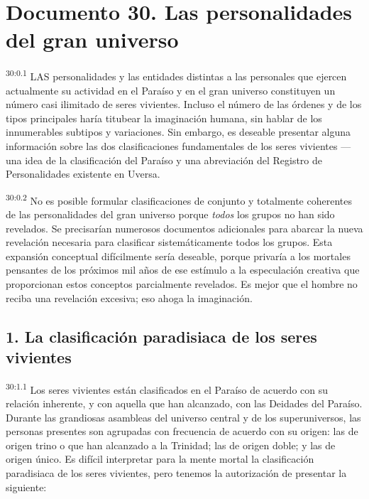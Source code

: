 \chapter{Documento 30. Las personalidades del gran universo}
\par
\textsuperscript{30:0.1} LAS personalidades y las entidades distintas a las personales que ejercen actualmente su actividad en el Paraíso y en el gran universo constituyen un número casi ilimitado de seres vivientes. Incluso el número de las órdenes y de los tipos principales haría titubear la imaginación humana, sin hablar de los innumerables subtipos y variaciones. Sin embargo, es deseable presentar alguna información sobre las dos clasificaciones fundamentales de los seres vivientes ---una idea de la clasificación del Paraíso y una abreviación del Registro de Personalidades existente en Uversa.

\par
\textsuperscript{30:0.2} No es posible formular clasificaciones de conjunto y totalmente coherentes de las personalidades del gran universo porque \textit{todos} los grupos no han sido revelados. Se precisarían numerosos documentos adicionales para abarcar la nueva revelación necesaria para clasificar sistemáticamente todos los grupos. Esta expansión conceptual difícilmente sería deseable, porque privaría a los mortales pensantes de los próximos mil años de ese estímulo a la especulación creativa que proporcionan estos conceptos parcialmente revelados. Es mejor que el hombre no reciba una revelación excesiva; eso ahoga la imaginación.

\section*{1. La clasificación paradisiaca de los seres vivientes}
\par
\textsuperscript{30:1.1} Los seres vivientes están clasificados en el Paraíso de acuerdo con su relación inherente, y con aquella que han alcanzado, con las Deidades del Paraíso. Durante las grandiosas asambleas del universo central y de los superuniversos, las personas presentes son agrupadas con frecuencia de acuerdo con su origen: las de origen trino o que han alcanzado a la Trinidad; las de origen doble; y las de origen único. Es difícil interpretar para la mente mortal la clasificación paradisiaca de los seres vivientes, pero tenemos la autorización de presentar la siguiente:

